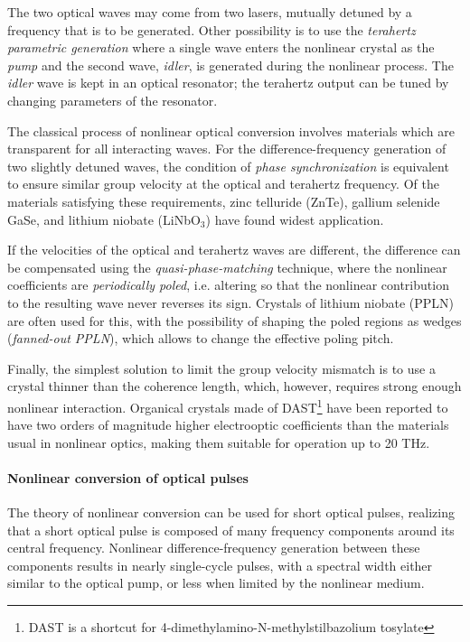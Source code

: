 The two optical waves may come from two lasers, mutually detuned by a frequency that is to be generated. Other possibility is to use the \textit{terahertz parametric generation} where a single wave enters the nonlinear crystal as the \textit{pump} and the second wave, \textit{idler}, is generated during the nonlinear process. The \textit{idler} wave is kept in an optical resonator; the terahertz output can be tuned by changing parameters of the resonator.

The classical process of nonlinear optical conversion involves materials which are transparent for all interacting waves. For the difference-frequency generation of two slightly detuned waves, the condition of \textit{phase synchronization} is equivalent to ensure similar group velocity at the optical and terahertz frequency. Of the materials satisfying these requirements, zinc telluride (ZnTe), gallium selenide GaSe, and lithium niobate (LiNbO$_{3}$) have found widest application. 

If the velocities of the optical and terahertz waves are different, the difference can be compensated using the \textit{quasi-phase-matching} technique, where the nonlinear coefficients are \textit{periodically poled}, i.e. altering so that the nonlinear contribution to the resulting wave never reverses its sign. Crystals of lithium niobate (PPLN) are often used for this, with the possibility of shaping the poled regions as wedges (\textit{fanned-out PPLN}), which allows to change the effective poling pitch.

Finally, the simplest solution to limit the group velocity mismatch is to use a crystal thinner than the coherence length, which, however, requires strong enough nonlinear interaction.
Organical crystals made of DAST\footnote{DAST is a shortcut for 4-dimethylamino-N-methylstilbazolium tosylate} have been reported\cite{han2000use} to have two orders of magnitude higher electrooptic coefficients than the materials usual in nonlinear optics, making them suitable for operation up to 20 THz.

\paragraph{Nonlinear conversion of optical pulses}
The theory of nonlinear conversion can be used for short optical pulses, realizing that a short optical pulse is composed of many frequency components around its central frequency. Nonlinear difference-frequency generation between these components results in nearly single-cycle pulses, with a spectral width either similar to the optical pump, or less when limited by the nonlinear medium.

